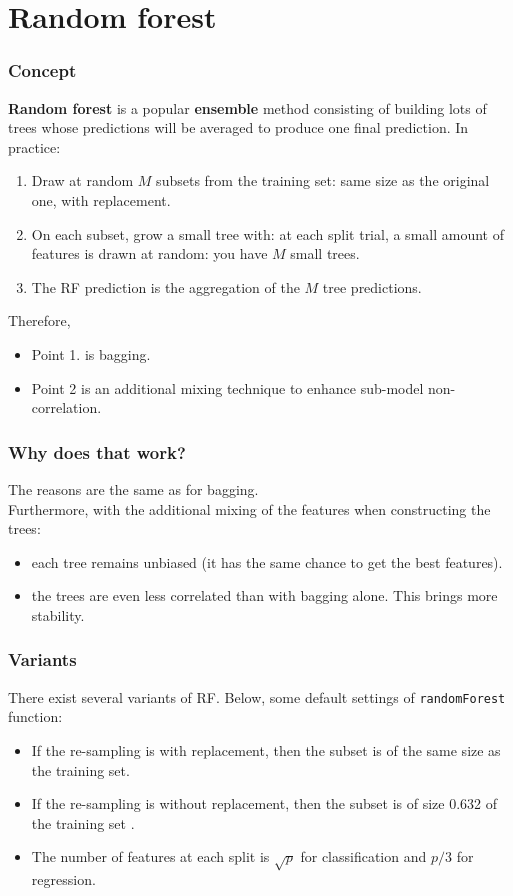 \section{Random forest}
\begin{frame}
\frametitle{Concept}
{\bf Random forest} is a popular {\bf ensemble} method consisting of building lots of trees whose predictions will be averaged to produce one final prediction. In practice: 
\begin{enumerate}
\item Draw at random $M$ subsets from the training set: same size as the original one, with replacement. 
\item On each subset, grow a small tree with: at each split trial, a small amount of features is drawn at random: you have $M$ small trees.
\item The RF prediction is the aggregation of the $M$ tree predictions.\\
\end{enumerate}
Therefore, \\
\begin{itemize}
\item Point 1. is bagging. 
\item Point 2 is an additional mixing technique to enhance sub-model non-correlation.
\end{itemize}
\end{frame}
\begin{frame}
\frametitle{Why does that work?}
The reasons are the same as for bagging.\\
\vspace{0.3cm} 
Furthermore, with the additional mixing of the features when constructing the trees:
\begin{itemize}
\item each tree remains unbiased (it has the same chance to get the best features).
\item the trees are even less correlated than with bagging alone. This brings more stability.
\end{itemize}
\end{frame}
\begin{frame}
\frametitle{Variants}
There exist several variants of RF. Below, some default settings of {\tt randomForest} function:
\begin{itemize}
\item If the re-sampling is with replacement, then the subset is of the same size as the training set.
\item If the re-sampling is without replacement, then the subset is of size 0.632 of the training set . 
\item The number of features at each split is $\sqrt{p}$ for classification and $p/3$ for regression. 
\end{itemize}
\end{frame}
